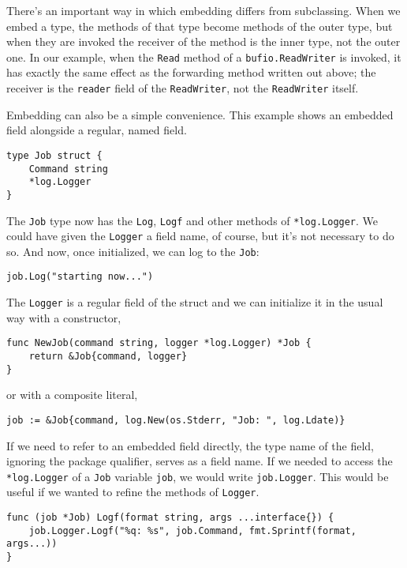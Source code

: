 There's an important way in which embedding differs from subclassing.
When we embed a type, the methods of that type become methods of the
outer type, but when they are invoked the receiver of the method is the
inner type, not the outer one. In our example, when the \texttt{Read}
method of a \texttt{bufio.ReadWriter} is invoked, it has exactly the
same effect as the forwarding method written out above; the receiver is
the \texttt{reader} field of the \texttt{ReadWriter}, not the
\texttt{ReadWriter} itself.

Embedding can also be a simple convenience. This example shows an
embedded field alongside a regular, named field.

\begin{Verbatim}[frame=single]
type Job struct {
    Command string
    *log.Logger
}
\end{Verbatim}

The \texttt{Job} type now has the \texttt{Log}, \texttt{Logf} and other
methods of \texttt{*log.Logger}. We could have given the \texttt{Logger}
a field name, of course, but it's not necessary to do so. And now, once
initialized, we can log to the \texttt{Job}:

\begin{Verbatim}[frame=single]
job.Log("starting now...")
\end{Verbatim}

The \texttt{Logger} is a regular field of the struct and we can
initialize it in the usual way with a constructor,

\begin{Verbatim}[frame=single]
func NewJob(command string, logger *log.Logger) *Job {
    return &Job{command, logger}
}
\end{Verbatim}

or with a composite literal,

\begin{Verbatim}[frame=single]
job := &Job{command, log.New(os.Stderr, "Job: ", log.Ldate)}
\end{Verbatim}

If we need to refer to an embedded field directly, the type name of the
field, ignoring the package qualifier, serves as a field name. If we
needed to access the \texttt{*log.Logger} of a \texttt{Job} variable
\texttt{job}, we would write \texttt{job.Logger}. This would be useful
if we wanted to refine the methods of \texttt{Logger}.

\begin{Verbatim}[frame=single]
func (job *Job) Logf(format string, args ...interface{}) {
    job.Logger.Logf("%q: %s", job.Command, fmt.Sprintf(format, args...))
}
\end{Verbatim}

